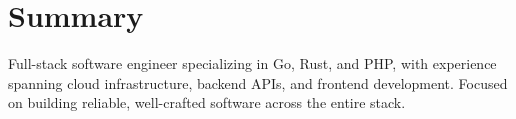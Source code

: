 \section{Summary}
\noindent Full-stack software engineer specializing in Go, Rust, and PHP, with experience spanning
cloud infrastructure, backend APIs, and frontend development. Focused on building reliable,
well-crafted software across the entire stack.

\vspace{0.75em}
